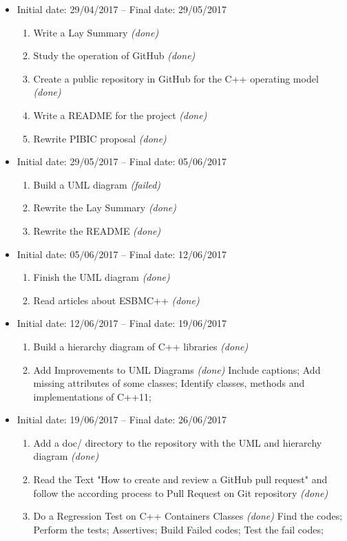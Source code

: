 \documentclass[11pt]{article}
\begin{document}
\begin{itemize}
	\item Initial date: 29/04/2017 -- Final date: 29/05/2017
	\begin{enumerate}
		\item Write a Lay Summary {\it (done)}
		\item Study the operation of GitHub {\it (done)}
		\item Create a public repository in GitHub for the C++ operating model {\it (done)}
		\item Write a README for the project {\it (done)}
		\item Rewrite PIBIC proposal {\it (done)}
	\end{enumerate}
	
	\item Initial date: 29/05/2017 -- Final date: 05/06/2017
	\begin{enumerate}
		\item Build a UML diagram {\it (failed)}
		\item Rewrite the Lay Summary {\it (done)}
		\item Rewrite the README {\it (done)}		
	\end{enumerate}
	
	\item Initial date: 05/06/2017 -- Final date: 12/06/2017
	\begin{enumerate}
		\item Finish the UML diagram {\it (done)}
		\item Read articles about ESBMC++ {\it (done)}				
	\end{enumerate}
	
	\item Initial date: 12/06/2017 -- Final date: 19/06/2017
	\begin{enumerate}
		\item Build a hierarchy diagram of C++ libraries {\it (done)}
		\item Add Improvements to UML Diagrams {\it (done)}
		    \subitem Include captions;
		    \subitem Add missing attributes of some classes;
		    \subitem Identify classes, methods and implementations of C++11;
	\end{enumerate}
	
		\item Initial date: 19/06/2017 -- Final date: 26/06/2017
	\begin{enumerate}
		\item Add a doc/ directory to the repository with the UML and hierarchy diagram {\it (done)}
		\item Read the Text "How to create and review a GitHub pull request" and follow the according process to Pull Request on Git repository {\it (done)}
		\item Do a Regression Test on C++ Containers Classes {\it (done)}
			\subitem Find the codes;
			\subitem Perform the tests;
			\subitem Assertives;
			\subitem Build Failed codes;
			\subitem Test the fail codes;
	\end{enumerate}
	

\end{itemize}
\end{document}
